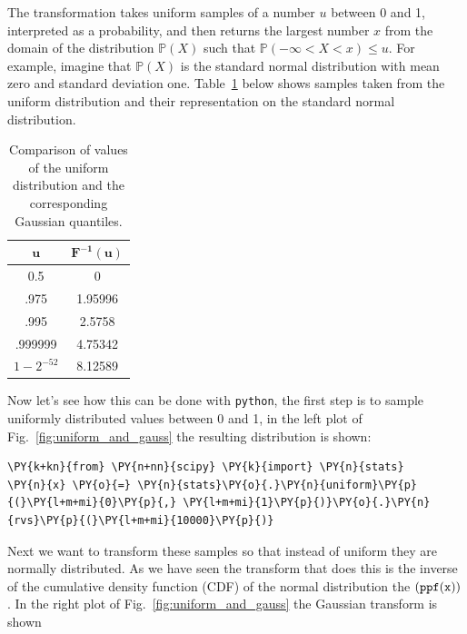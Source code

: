 The transformation takes uniform samples of a number \(u\) between 0 and
1, interpreted as a probability, and then returns the largest number
\(x\) from the domain of the distribution \(\mathbb{P}(X)\) such that
\(\mathbb{P}(-\infty <X<x)\le u\). For example, imagine that
\(\mathbb{P}(X)\) is the standard normal distribution with mean zero and
standard deviation one. Table~\ref{tab:transformation} below shows samples taken from the
uniform distribution and their representation on the standard normal
distribution.

\begin{table}[h]
  \centering
  \begin{tabular}{|c|c|}
    \hline
    \(\mathbf{u}\) & \(\mathbf{F^{-1}(u)}\) \\
    \hline
    0.5 & 0 \\
        \hline
        .975 & 1.95996 \\
            \hline
            .995 & 2.5758 \\
                \hline
                .999999 & 4.75342 \\
                    \hline
                    \(1-2^{-52}\) & 8.12589 \\
                        \hline
  \end{tabular}
  \caption{Comparison of values of the uniform distribution and the corresponding Gaussian quantiles.}
\label{tab:transformation}
\end{table}

Now let's see how this can be done with \texttt{python}, the first step is to sample
uniformly distributed values between 0 and 1, in the left plot of Fig.~\ref{fig:uniform_and_gauss} the resulting distribution is shown:

\begin{tcolorbox}[breakable, size=fbox, boxrule=1pt, pad at break*=1mm,colback=cellbackground, colframe=cellborder]
\begin{Verbatim}[commandchars=\\\{\}]
\PY{k+kn}{from} \PY{n+nn}{scipy} \PY{k}{import} \PY{n}{stats}
\PY{n}{x} \PY{o}{=} \PY{n}{stats}\PY{o}{.}\PY{n}{uniform}\PY{p}{(}\PY{l+m+mi}{0}\PY{p}{,} \PY{l+m+mi}{1}\PY{p}{)}\PY{o}{.}\PY{n}{rvs}\PY{p}{(}\PY{l+m+mi}{10000}\PY{p}{)}
\end{Verbatim}
\end{tcolorbox}

    Next we want to transform these samples so that instead of uniform they
are normally distributed. As we have seen the transform that does this
is the inverse of the cumulative density function (CDF) of the normal
distribution the \((\tt{ppf(x))}\). In the right plot of Fig.~\ref{fig:uniform_and_gauss} the Gaussian transform is shown

